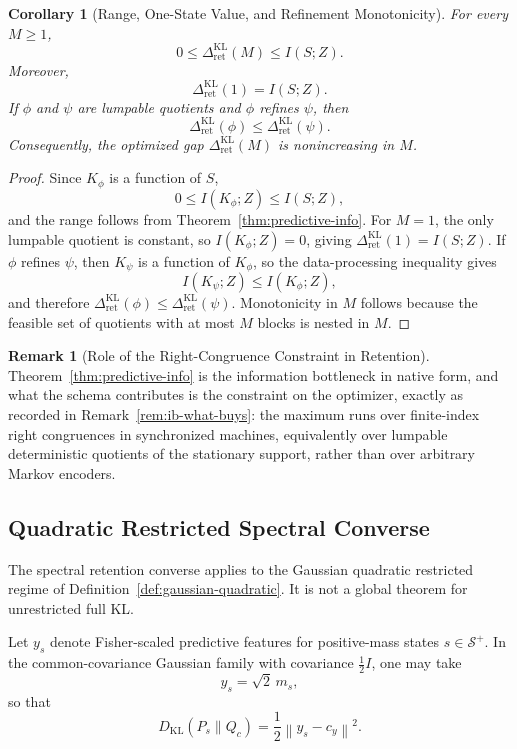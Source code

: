 \documentclass[12pt]{article}
\newtheorem{corollary}[theorem]{Corollary}
\theoremstyle{definition}
\newtheorem{remark}[theorem]{Remark}
\newcommand{\norm}[1]{\left\lVert#1\right\rVert}
\newcommand{\RetKL}{\Delta_{\mathrm{ret}}^{\mathrm{KL}}}
\newcommand{\Splus}{\mathcal S^{+}}
\begin{document}
\begin{corollary}[Range, One-State Value, and Refinement Monotonicity]
\label{cor:retention-elementary}
For every $M\ge1$,
\[
0\le \RetKL(M)\le I(S;Z).
\]
Moreover,
\[
\RetKL(1)=I(S;Z).
\]
If $\phi$ and $\psi$ are lumpable quotients and $\phi$ refines $\psi$, then
\[
\RetKL(\phi)\le \RetKL(\psi).
\]
Consequently, the optimized gap $\RetKL(M)$ is nonincreasing in $M$.
\end{corollary}

\begin{proof}
Since $K_\phi$ is a function of $S$,
\[
0\le I(K_\phi;Z)\le I(S;Z),
\]
and the range follows from Theorem~\ref{thm:predictive-info}.  For $M=1$, the
only lumpable quotient is constant, so $I(K_\phi;Z)=0$, giving
$\RetKL(1)=I(S;Z)$.  If $\phi$ refines $\psi$, then $K_\psi$ is a function of
$K_\phi$, so the data-processing inequality gives
\[
I(K_\psi;Z)\le I(K_\phi;Z),
\]
and therefore $\RetKL(\phi)\le\RetKL(\psi)$.  Monotonicity in $M$ follows
because the feasible set of quotients with at most $M$ blocks is nested in
$M$.
\end{proof}


\begin{remark}[Role of the Right-Congruence Constraint in Retention]
\label{rem:retention-what-buys}
Theorem~\ref{thm:predictive-info} is the information bottleneck
\cite{tishby1999,bialek2001} in native form, and what the schema contributes is
the constraint on the optimizer, exactly as recorded in
Remark~\ref{rem:ib-what-buys}: the maximum runs over finite-index right
congruences in synchronized machines, equivalently over lumpable deterministic
quotients of the stationary support, rather than over arbitrary Markov
encoders.
\end{remark}

\subsection{Quadratic Restricted Spectral Converse}
\label{subsec:quad-spectral}

The spectral retention converse applies to the Gaussian quadratic restricted
regime of Definition~\ref{def:gaussian-quadratic}.  It is not a global theorem
for unrestricted full KL.

Let $y_s$ denote Fisher-scaled predictive features for positive-mass states
$s\in\Splus$.  In the common-covariance Gaussian family with covariance
$\frac12 I$, one may take
\[
y_s=\sqrt{2}\,m_s,
\]
so that
\[
D_{\mathrm{KL}}(P_s\|Q_c)
=
\frac12
\norm{y_s-c_y}^2.
\]
\end{document}

